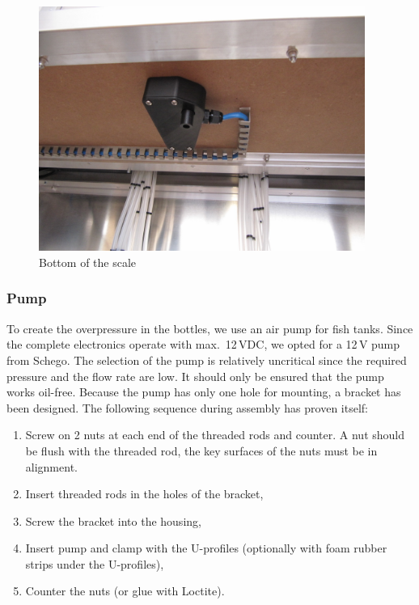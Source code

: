 \documentclass[a4paper]{scrartcl}
\begin{document}
\begin{figure}
  \centering
  \includegraphics[height=8cm]{pics/scale_bottom.JPG}
  \caption{Bottom of the scale}
\end{figure}
  
\subsubsection{Pump}
To create the overpressure in the bottles, we use an air pump for fish tanks. Since the complete electronics operate with max.~12\,VDC, we opted for a 12\,V pump from Schego. The selection of the pump is relatively uncritical since the required pressure and the flow rate are low. It should only be ensured that the pump works oil-free. Because the pump has only one hole for mounting, a bracket has been designed. The following sequence during assembly has proven itself:

\begin {enumerate}
  \item Screw on 2 nuts at each end of the threaded rods and counter. A nut should be flush with the threaded rod, the key surfaces of the nuts must be in alignment.
  \item Insert threaded rods in the holes of the bracket,
  \item Screw the bracket into the housing,
  \item Insert pump and clamp with the U-profiles (optionally with foam rubber strips under the U-profiles),
  \item Counter the nuts (or glue with Loctite).
\end{enumerate}
\end{document}
